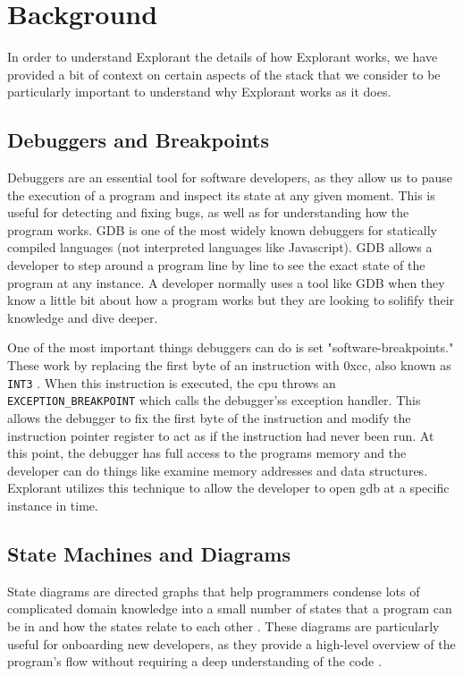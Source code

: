 \chapter{Background}
In order to understand Explorant the details of how Explorant works, we have provided a bit of context on certain aspects of the stack that we consider to be particularly important to understand why Explorant works as it does.

\section{Debuggers and Breakpoints}
\label{sec:debuggers}
Debuggers are an essential tool for software developers, as they allow us to pause the execution of a program and inspect its state at any given moment. This is useful for detecting and fixing bugs, as well as for understanding how the program works. GDB \cite{gdb} is one of the most widely known debuggers for statically compiled languages (not interpreted languages like Javascript). GDB allows a developer to step around a program line by line to see the exact state of the program at any instance. A developer normally uses a tool like GDB when they know a little bit about how a program works but they are looking to solifify their knowledge and dive deeper. 

One of the most important things debuggers can do is set "software-breakpoints." These work by replacing the first byte of an instruction with 0xcc, also known as \texttt{INT3} \cite{int3}. When this instruction is executed, the cpu throws an \texttt{EXCEPTION\_BREAKPOINT} which calls the debugger'ss exception handler. This allows the debugger to fix the first byte of the instruction and modify the instruction pointer register to act as if the instruction had never been run. At this point, the debugger has full access to the programs memory and the developer can do things like examine memory addresses and data structures. Explorant utilizes this technique to allow the developer to open gdb at a specific instance in time. 


\section{State Machines and Diagrams}
\label{sec:fsm}

State diagrams are directed graphs that help programmers condense lots of complicated domain knowledge into a small number of states that a program can be in and how the states relate to each other \cite{state}. These diagrams are particularly useful for onboarding new developers, as they provide a high-level overview of the program's flow without requiring a deep understanding of the code \cite{onboarding-ramp, state}.

